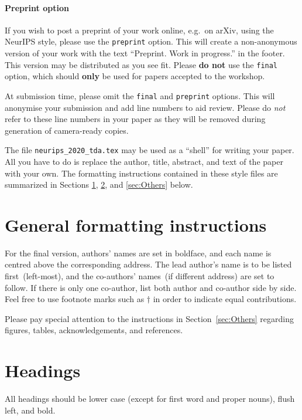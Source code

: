\documentclass{article}
\begin{document}
\paragraph{Preprint option}
%
If you wish to post a preprint of your work online, e.g.\ on arXiv, using the
NeurIPS style, please use the \verb+preprint+ option. This will create a
non-anonymous version of your work with the text ``Preprint. Work in progress.''
in the footer. This version may be distributed as you see fit. Please \textbf{do
  not} use the \verb+final+ option, which should \textbf{only} be used for
papers accepted to the workshop.

At submission time, please omit the \verb+final+ and \verb+preprint+
options. This will anonymise your submission and add line numbers to aid
review. Please do \emph{not} refer to these line numbers in your paper as they
will be removed during generation of camera-ready copies.

The file \verb+neurips_2020_tda.tex+ may be used as a ``shell'' for writing your
paper. All you have to do is replace the author, title, abstract, and text of
the paper with your own.
%
The formatting instructions contained in these style files are summarized in
Sections \ref{sec:General formatting instructions}, \ref{sec:Headings},
and \ref{sec:Others} below.

\section{General formatting instructions}
\label{sec:General formatting instructions}

For the final version, authors' names are set in boldface, and each name is
centred above the corresponding address. The lead author's name is to be listed
first~(left-most), and the co-authors' names~(if different address) are set to
follow. If there is only one co-author, list both author and co-author side by
side. Feel free to use footnote marks such as $\dagger$ in order to indicate
equal contributions.

Please pay special attention to the instructions in Section~\ref{sec:Others}
regarding figures, tables, acknowledgements, and references.

\section{Headings}
\label{sec:Headings}

All headings should be lower case (except for first word and proper nouns),
flush left, and bold.
\end{document}
